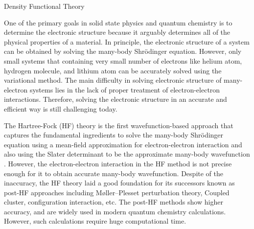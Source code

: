 	{\centering
		\vspace{12pt} Density Functional Theory
	    \par
	}

One of the primary goals in solid state physics and quantum chemistry is to determine the electronic structure because it arguably determines all of the physical properties of a material. In principle, the electronic structure of a system can be obtained by solving the many-body Shr\"{o}dinger equation. However, only small systems that containing very small number of electrons like helium atom, hydrogen molecule, and lithium atom can be accurately solved using the variational method. The main difficulty in solving electronic structure of many-electron systems lies in the lack of proper treatment of electron-electron interactions. Therefore, solving the electronic structure in an accurate and efficient way is still challenging today.

The Hartree-Fock (HF) theory is the first wavefunction-based approach that captures the fundamental ingredients to solve the many-body  Shr\"{o}dinger equation using a mean-field approximation for electron-electron interaction and also using the Slater determinant to be the approximate many-body wavefunction \cite{hartree1928wave,fock1930naherungsmethode,slater1951simplification}. However, the electron-electron interaction in the HF method is not precise enough for it to obtain accurate many-body wavefunction. Despite of the inaccuracy, the HF theory laid a good foundation for its successors known as post-HF approaches including M\o ller–Plesset perturbation theory, Coupled cluster, configuration interaction, etc. The post-HF methods show higher accuracy, and are widely used in modern quantum chemistry calculations. However, such calculations require huge computational time.

